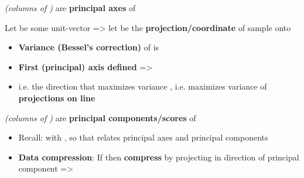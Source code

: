 \hSep %

 \emph{(columns of )} are \textbf{principal axes} of 

Let  be some unit-vector => let
 be the
\textbf{projection/coordinate} of sample  onto

\begin{itemize}

      \item
            \textbf{Variance (Bessel's correction)} of
             is
      \item
            \textbf{First (principal) axis defined} =\textgreater{}
      \item
            i.e.  the direction that maximizes
            variance , i.e. maximizes
            variance of \textbf{projections on line}
\end{itemize}

\emph{(columns of )} are \textbf{principal
      components/scores} of 

\begin{itemize}

      \item
            Recall:
            with , so that
            relates principal axes and principal components
      \item
            \textbf{Data compression}: If 
            then \textbf{compress}  by projecting in direction of
            principal component =\textgreater{}
\end{itemize}
